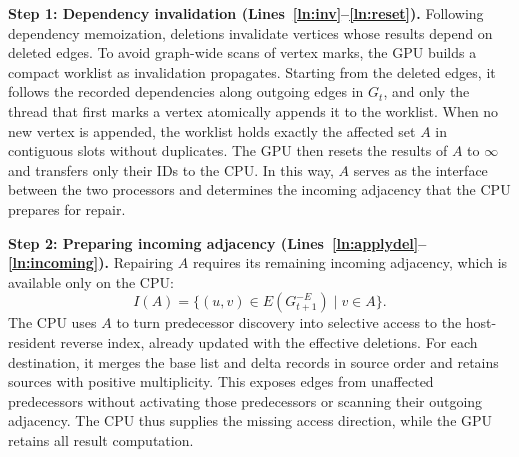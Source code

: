 

\textbf{Step 1: Dependency invalidation (Lines~\ref{ln:inv}--\ref{ln:reset}).} Following dependency memoization, deletions invalidate vertices whose results depend on deleted edges. To avoid graph-wide scans of vertex marks, the GPU builds a compact worklist as invalidation propagates. Starting from the deleted edges, it follows the recorded dependencies along outgoing edges in $G_t$, and only the thread that first marks a vertex atomically appends it to the worklist. When no new vertex is appended, the worklist holds exactly the affected set $A$ in contiguous slots without duplicates. The GPU then resets the results of $A$ to $\infty$ and transfers only their IDs to the CPU. In this way, $A$ serves as the interface between the two processors and determines the incoming adjacency that the CPU prepares for repair.

\textbf{Step 2: Preparing incoming adjacency (Lines~\ref{ln:applydel}--\ref{ln:incoming}).} Repairing $A$ requires its remaining incoming adjacency, which is available only on the CPU:
\begin{equation}
I(A)=\{(u,v)\in E(G_{t+1}^{-E})\mid v\in A\}.
\end{equation}
The CPU uses $A$ to turn predecessor discovery into selective access to the host-resident reverse index, already updated with the effective deletions. For each destination, it merges the base list and delta records in source order and retains sources with positive multiplicity. This exposes edges from unaffected predecessors without activating those predecessors or scanning their outgoing adjacency. The CPU thus supplies the missing access direction, while the GPU retains all result computation.

